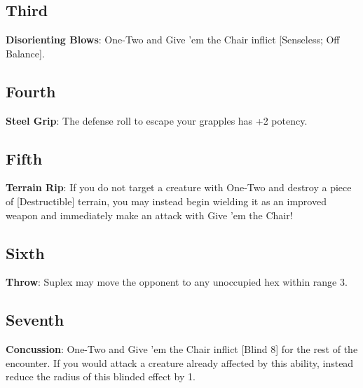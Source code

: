 \begin{multicols*}{2}
\subsection*{Third \Facet\perk}
\textbf{Disorienting Blows}: One-Two and Give 'em the Chair inflict [Senseless; Off Balance].

\subsection*{Fourth \Facet\perk}
\textbf{Steel Grip}: The defense roll to escape your grapples has +2 potency.

\subsection*{Fifth \Facet\perk}
\textbf{Terrain Rip}: If you do not target a creature with One-Two and destroy a piece of [Destructible] terrain, you may instead begin wielding it as an improved weapon and immediately make an attack with Give 'em the Chair!

\subsection*{Sixth \Facet\perk}
\textbf{Throw}: Suplex may move the opponent to any unoccupied hex within range 3.

\subsection*{Seventh \Facet\perk}
\textbf{Concussion}: One-Two and Give 'em the Chair inflict [Blind 8] for the rest of the encounter. If you would attack a creature already affected by this ability, instead reduce the radius of this blinded effect by 1.

\end{multicols*}
